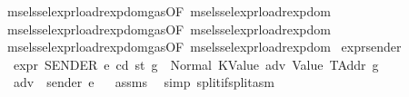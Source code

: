 \begin{isabellebody}
\ \ msel{\isacharunderscore}{\kern0pt}ssel{\isacharunderscore}{\kern0pt}expr{\isacharunderscore}{\kern0pt}load{\isacharunderscore}{\kern0pt}rexp{\isacharunderscore}{\kern0pt}dom{\isacharunderscore}{\kern0pt}gas{\isacharparenleft}{\kern0pt}{}{\isacharparenright}{\kern0pt}{\isacharbrackleft}{\kern0pt}OF\ msel{\isacharunderscore}{\kern0pt}ssel{\isacharunderscore}{\kern0pt}expr{\isacharunderscore}{\kern0pt}load{\isacharunderscore}{\kern0pt}rexp{\isacharunderscore}{\kern0pt}dom{\isacharparenleft}{\kern0pt}{}{\isacharparenright}{\kern0pt}{\isacharbrackright}{\kern0pt}\isanewline
\ \ msel{\isacharunderscore}{\kern0pt}ssel{\isacharunderscore}{\kern0pt}expr{\isacharunderscore}{\kern0pt}load{\isacharunderscore}{\kern0pt}rexp{\isacharunderscore}{\kern0pt}dom{\isacharunderscore}{\kern0pt}gas{\isacharparenleft}{\kern0pt}{}{\isacharparenright}{\kern0pt}{\isacharbrackleft}{\kern0pt}OF\ msel{\isacharunderscore}{\kern0pt}ssel{\isacharunderscore}{\kern0pt}expr{\isacharunderscore}{\kern0pt}load{\isacharunderscore}{\kern0pt}rexp{\isacharunderscore}{\kern0pt}dom{\isacharparenleft}{\kern0pt}{}{\isacharparenright}{\kern0pt}{\isacharbrackright}{\kern0pt}\isanewline
\ \ msel{\isacharunderscore}{\kern0pt}ssel{\isacharunderscore}{\kern0pt}expr{\isacharunderscore}{\kern0pt}load{\isacharunderscore}{\kern0pt}rexp{\isacharunderscore}{\kern0pt}dom{\isacharunderscore}{\kern0pt}gas{\isacharparenleft}{\kern0pt}{}{\isacharparenright}{\kern0pt}{\isacharbrackleft}{\kern0pt}OF\ msel{\isacharunderscore}{\kern0pt}ssel{\isacharunderscore}{\kern0pt}expr{\isacharunderscore}{\kern0pt}load{\isacharunderscore}{\kern0pt}rexp{\isacharunderscore}{\kern0pt}dom{\isacharparenleft}{\kern0pt}{}{\isacharparenright}{\kern0pt}{\isacharbrackright}{\kern0pt}\isanewline
\isanewline
{}\isamarkupfalse%
\ expr{\isacharunderscore}{\kern0pt}sender{\isacharcolon}{\kern0pt}\isanewline
\ \ \ {\isachardoublequoteopen}expr\ SENDER\ e\ cd\ st\ g\ {\isacharequal}{\kern0pt}\ Normal\ {\isacharparenleft}{\kern0pt}{\isacharparenleft}{\kern0pt}KValue\ adv{\isacharcomma}{\kern0pt}\ Value\ TAddr{\isacharparenright}{\kern0pt}{\isacharcomma}{\kern0pt}\ g{\isacharprime}{\kern0pt}{\isacharparenright}{\kern0pt}{\isachardoublequoteclose}\isanewline
\ \ \ {\isachardoublequoteopen}adv\ {\isacharequal}{\kern0pt}\ sender\ e{\isachardoublequoteclose}%
\isadelimproof
\ %
\endisadelimproof
%
\isatagproof
{}\isamarkupfalse%
\ assms\ \isamarkupfalse%
\ {\isacharparenleft}{\kern0pt}simp\ split{\isacharcolon}{\kern0pt}if{\isacharunderscore}{\kern0pt}split{\isacharunderscore}{\kern0pt}asm{\isacharparenright}{\kern0pt}%

\end{isabellebody}
